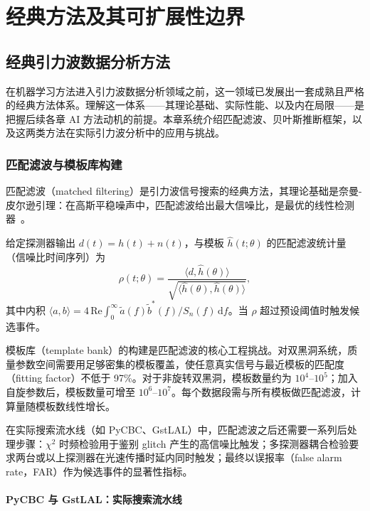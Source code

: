 \pagestyle{mystyle}

\part{经典方法及其可扩展性边界}

\renewcommand{\parttitle}{经典方法及其可扩展性边界}

\chapter{经典引力波数据分析方法}

在机器学习方法进入引力波数据分析领域之前，这一领域已发展出一套成熟且严格的经典方法体系。理解这一体系——其理论基础、实际性能、以及内在局限——是把握后续各章 AI 方法动机的前提。本章系统介绍匹配滤波、贝叶斯推断框架，以及这两类方法在实际引力波分析中的应用与挑战。

\section{匹配滤波与模板库构建}

匹配滤波（matched filtering）是引力波信号搜索的经典方法，其理论基础是奈曼-皮尔逊引理：在高斯平稳噪声中，匹配滤波给出最大信噪比，是最优的线性检测器~\cite{Allen2012PyCBC}。

给定探测器输出 $d(t) = h(t) + n(t)$，与模板 $\hat{h}(t;\theta)$ 的匹配滤波统计量（信噪比时间序列）为
\begin{equation}
  \rho(t;\theta) = \frac{\langle d, \hat{h}(\theta)\rangle}{\sqrt{\langle \hat{h}(\theta), \hat{h}(\theta)\rangle}},
\end{equation}
其中内积 $\langle a,b\rangle = 4\,\mathrm{Re}\int_0^\infty \tilde{a}(f)\tilde{b}^*(f)/S_n(f)\,\mathrm{d}f$。当 $\rho$ 超过预设阈值时触发候选事件。

模板库（template bank）的构建是匹配滤波的核心工程挑战。对双黑洞系统，质量参数空间需要用足够密集的模板覆盖，使任意真实信号与最近模板的匹配度（fitting factor）不低于 97\%。对于非旋转双黑洞，模板数量约为 $10^4$--$10^5$；加入自旋参数后，模板数量可增至 $10^6$--$10^7$。每个数据段需与所有模板做匹配滤波，计算量随模板数线性增长。

在实际搜索流水线（如 PyCBC、GstLAL）中，匹配滤波之后还需要一系列后处理步骤：$\chi^2$ 时频检验用于鉴别 glitch 产生的高信噪比触发；多探测器耦合检验要求两台或以上探测器在光速传播时延内同时触发；最终以误报率（false alarm rate，FAR）作为候选事件的显著性指标。

\subsection{PyCBC 与 GstLAL：实际搜索流水线}

